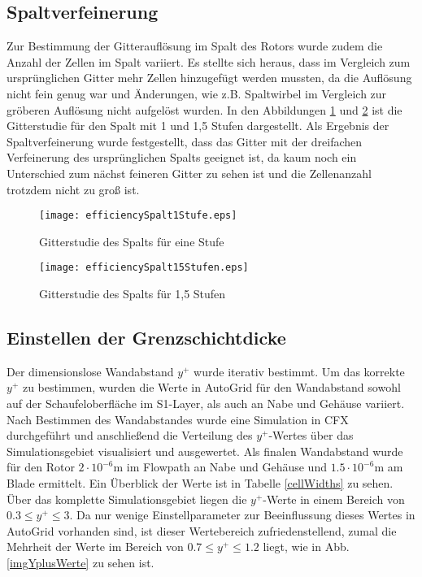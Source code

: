 \subsection{Spaltverfeinerung}

Zur Bestimmung der Gitterauflösung im Spalt des Rotors wurde zudem die Anzahl der Zellen im Spalt variiert. Es stellte sich heraus, dass im Vergleich zum ursprünglichen Gitter mehr Zellen hinzugefügt werden mussten, da die Auflösung nicht fein genug war und Änderungen, wie z.B. Spaltwirbel im Vergleich zur gröberen Auflösung nicht aufgelöst wurden. In den Abbildungen \ref{effSpalt1} und \ref{effSpalt15} ist die Gitterstudie für den Spalt mit 1 und 1,5 Stufen dargestellt. Als Ergebnis der Spaltverfeinerung wurde festgestellt, dass das Gitter mit der dreifachen Verfeinerung des ursprünglichen Spalts geeignet ist, da kaum noch ein Unterschied zum nächst feineren Gitter zu sehen ist und die Zellenanzahl trotzdem nicht zu groß ist.


\begin{figure}[H]
	\centering
	\texttt{[image: efficiencySpalt1Stufe.eps]}
	\caption{Gitterstudie des Spalts für eine Stufe} \label{effSpalt1}
\end{figure}

\begin{figure}[H]
	\centering
	\texttt{[image: efficiencySpalt15Stufen.eps]}
	\caption{Gitterstudie des Spalts für 1,5 Stufen} \label{effSpalt15}
\end{figure}

\subsection{Einstellen der Grenzschichtdicke}
Der dimensionslose Wandabstand $y^+$ wurde iterativ bestimmt. Um das korrekte $y^+$ zu bestimmen, wurden die Werte in AutoGrid für den Wandabstand sowohl auf der Schaufeloberfläche im S1-Layer, als auch an Nabe und Gehäuse variiert.  Nach Bestimmen des Wandabstandes wurde eine Simulation in CFX durchgeführt und anschließend die Verteilung des $y^+$-Wertes über das Simulationsgebiet visualisiert und ausgewertet. Als finalen Wandabstand wurde für den Rotor $2\cdot 10^{-6}\text{m}$ im Flowpath an Nabe und Gehäuse und $1.5\cdot 10^{-6}\text{m}$ am Blade ermittelt. Ein Überblick der Werte ist in Tabelle \ref{cellWidths} zu sehen. Über das komplette Simulationsgebiet liegen die $y^+$-Werte in einem Bereich von $0.3 \leq y^+ \leq 3$. Da nur wenige Einstellparameter zur Beeinflussung dieses Wertes in AutoGrid vorhanden sind, ist dieser Wertebereich zufriedenstellend, zumal die Mehrheit der Werte im Bereich von $0.7 \leq y^+ \leq 1.2$  liegt, wie in Abb. \ref{imgYplusWerte} zu sehen ist. 

